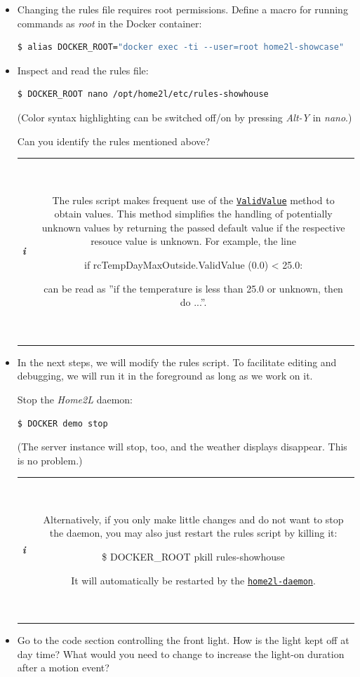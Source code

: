 \documentclass[12pt,english,parskip=half,headheight=19pt]{scrreprt}
\newcommand{\lstbox}[1]{
  \par
  \colorbox{lstbackground}{\ttfamily\footnotesize{\parbox{\linewidth}{#1}}}
  \par
}
\newcommand{\infobox}[1]{
  \par
  \medskip
  \hfill
  \setlength\arrayrulewidth{1pt}
  \begin{tabular}[t]{c|c|}
    \parbox{1.8em}{\hfill\textit{\Huge\textbf{i}\,}}
    &
    \,\parbox{0.89\linewidth}{\setlength{\parskip}{0.5em} \small #1}\,
  \end{tabular}
  \medskip
  \par
}
\newcommand{\idx}[1]{#1\index{#1}}
\newcommand{\reftool}[1]{\hyperref[tool:#1]{\texttt{\idx{#1}}}}
\newcommand{\refapipython}[1]{\href{home2l-api_python/index.html}{\mbox{\texttt{#1}}}}  %
\begin{document}
\begin{itemize}[$\blacktriangleright$]

\item
  Changing the rules file requires root permissions. Define a macro for running commands as
  \textit{root} in the Docker container:
  \begin{lstlisting}[language=bash]
    $ alias DOCKER_ROOT="docker exec -ti --user=root home2l-showcase"
  \end{lstlisting}

\item
  Inspect and read the rules file:
  \begin{lstlisting}[language=bash]
    $ DOCKER_ROOT nano /opt/home2l/etc/rules-showhouse
  \end{lstlisting}

  (Color syntax highlighting can be switched off/on by pressing \textit{Alt-Y} in \textit{nano}.)

  Can you identify the rules mentioned above?

  \infobox{
    The rules script makes frequent use of the \refapipython{ValidValue} method to obtain values.
    This method simplifies the handling of potentially unknown values by returning the passed
    default value if the respective resouce value is unknown. For example, the line
    \lstbox{if rcTempDayMaxOutside.ValidValue (0.0) < 25.0:}
    can be read as ''if the temperature is less than 25.0 or unknown, then do ...''.
  }

\item
  In the next steps, we will modify the rules script. To facilitate editing and debugging,
  we will run it in the foreground as long as we work on it.

  Stop the \textit{Home2L} daemon:
  \begin{lstlisting}[language=bash]
    $ DOCKER demo stop
  \end{lstlisting}

  (The server instance will stop, too, and the weather displays disappear. This is no problem.)

  \infobox{
    Alternatively, if you only make little changes and do not want to stop the daemon,
    you may also just restart the rules script by killing it:
    \lstbox{\$ DOCKER\_ROOT pkill rules-showhouse}
    It will automatically be restarted by the \reftool{home2l-daemon}.
  }

\item
  Go to the code section controlling the front light.
  How is the light kept off at day time?
  What would you need to change to increase the light-on duration after a motion event?


\end{itemize}
\end{document}
